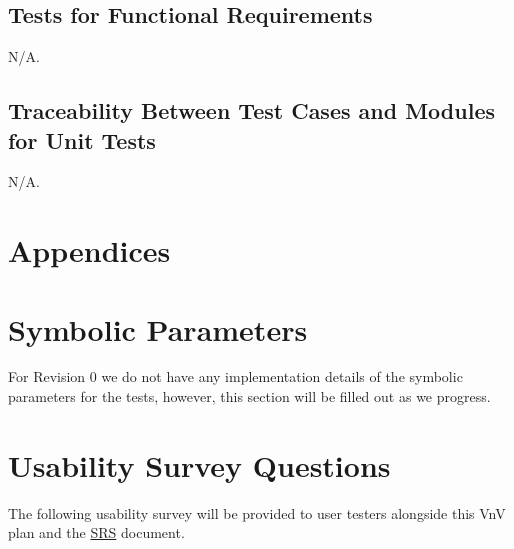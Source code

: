 \documentclass[12pt, titlepage]{article}
\begin{document}
\subsection{Tests for Functional Requirements}
N/A.




\subsection{Traceability Between Test Cases and Modules for Unit Tests}
N/A.


\newpage

\section*{Appendices}

\appendix

\section{Symbolic Parameters}
For Revision 0 we do not have any implementation details of the symbolic parameters for the tests, however, this section will be filled out as we progress.
\section{Usability Survey Questions}
The following usability survey will be provided to user testers alongside 
this VnV plan and the \href{https://github.com/emilyperica/ScoreGen/blob/main/docs/SRS-Volere/SRS.pdf}{SRS} document.
\end{document}
